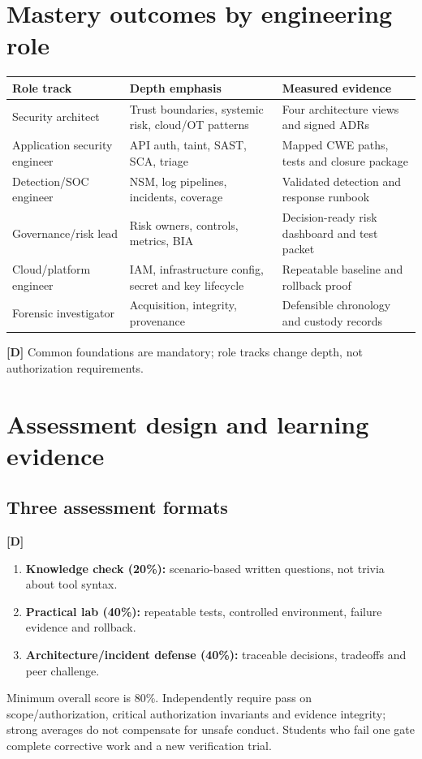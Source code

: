 \documentclass[10pt,letterpaper,oneside]{article}
\newcommand{\designed}{\textsf{\color{accent}\textbf{[D]}}}
\begin{document}
\section{Mastery outcomes by engineering role}
\par\medskip\noindent\begin{tabularx}{\textwidth}{@{}p{}X X@{}}\toprule
Role track & Depth emphasis & Measured evidence \\ \midrule
Security architect & Trust boundaries, systemic risk, cloud/OT patterns & Four architecture views and signed ADRs\\
Application security engineer & API auth, taint, SAST, SCA, triage & Mapped CWE paths, tests and closure package\\
Detection/SOC engineer & NSM, log pipelines, incidents, coverage & Validated detection and response runbook\\
Governance/risk lead & Risk owners, controls, metrics, BIA & Decision-ready risk dashboard and test packet\\
Cloud/platform engineer & IAM, infrastructure config, secret and key lifecycle & Repeatable baseline and rollback proof\\
Forensic investigator & Acquisition, integrity, provenance & Defensible chronology and custody records\\
\bottomrule\end{tabularx}\par\medskip
\designed{} Common foundations are mandatory; role tracks change depth, not authorization requirements.

\section{Assessment design and learning evidence}
\subsection{Three assessment formats}\designed{}
\begin{enumerate}
\item \textbf{Knowledge check (20\%):} scenario-based written questions, not trivia about tool syntax.
\item \textbf{Practical lab (40\%):} repeatable tests, controlled environment, failure evidence and rollback.
\item \textbf{Architecture/incident defense (40\%):} traceable decisions, tradeoffs and peer challenge.
\end{enumerate}
Minimum overall score is 80\%. Independently require pass on scope/authorization, critical authorization invariants and evidence integrity; strong averages do not compensate for unsafe conduct. Students who fail one gate complete corrective work and a new verification trial.
\end{document}

